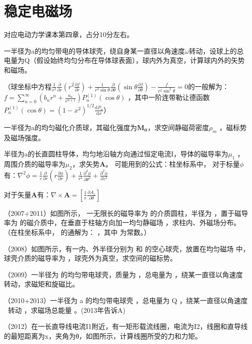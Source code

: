\section{稳定电磁场}
对应电动力学课本第四章，占分10分左右。

\begin{question}
一半径为a的均匀带电的导体球壳，绕自身某一直径以角速度$\omega$转动，设球上的总电量为Q（假设始终均匀分布在导体球表面），球内外为真空，计算球内外的矢势和磁场。

（球坐标中方程$\frac{1}{r^2}\frac{\partial }{\partial r}(r^2\frac{\partial f}{\partial r})+\frac{1}{r^2 \sin\theta}\frac{\partial }{\partial \theta}(\sin\theta\frac{\partial f}{\partial \theta})-\frac{f}{r^2\sin^2\theta}=0$的一般解为：$f=\sum_{n=0}^{\infty }(b_nr^n+\frac{a_n}{r^{n+1}})P_n^{(1)}(\cos\theta)$
 ，其中一阶连带勒让德函数$P_n^{(1)}(\cos\theta)=(1-x^2)^{1/2}\frac{\mathrm{d}P_n }{\mathrm{d} x}$）
 \end{question}
 
\begin{question}
一半径为a的均匀磁化介质球，其磁化强度为$\mathbf{M_0}$，求空间静磁荷密度$\rho_m$ ，磁标势及磁场强度。
\end{question}

\begin{question}
半径为a的长直圆柱导体，均匀地沿轴方向通过恒定电流I，导体的磁导率为$\mu_1$ ，周围介质的磁导率为$\mu_2$，求矢势$\mathbf{A}$。
可能用到的公式：柱坐标系中，
对于标量$\phi$有：$\nabla^2\phi=\frac{1}{r}\frac{\partial }{\partial r}(r\frac{\partial \phi}{\partial r})+\frac{1}{r^2 }\frac{\partial^2 \phi}{\partial \theta^2}+\frac{\partial^2\phi}{\partial z^2}$ 

对于矢量$\mathbf{A}$有：$\nabla \times \mathbf{A}=[\frac{1}{r}\frac{\partial A_z}{\partial \theta}]$
\end{question}

\begin{question}
（2007+2011）如图所示， 一无限长的磁导率为  的介质圆柱，半径为 ，置于磁导率为 的磁介质中，在垂直于柱轴方向加一均匀静磁场 ，求柱内、外磁场分布。
	（在柱坐标系中， 的通解为： ，其中 为常数。）
\end{question}

\begin{question}
（2008）如图所示，有一内、外半径分别为 和 的空心球壳，放置在均匀磁场  中，球壳介质的磁导率为 ，球壳外为真空，求空间的磁标势。
\end{question}

\begin{question}
（2009）一半径为 的均匀带电球壳，质量为 ，总电量为 ，绕某一直径以角速度 转动，求磁矩和旋磁比。
\end{question}

\begin{question}
（2010+2013）一半径为 a 的均匀带电球壳 ，总电量为 Q ，绕某一直径以角速度  转动 ，求磁场总能量 。(2013年告诉A)
\end{question}

\begin{question}
（2012）在一长直导线电流I1附近，有一矩形载流线圈，电流为I2，线圈和直导线的最短距离为x，夹角为θ，如图所示，计算线圈所受的力和力矩。

\end{question}